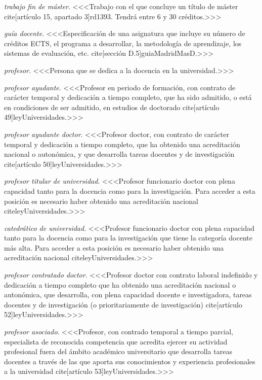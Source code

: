     \item \emph{trabajo fin de máster}. <<<Trabajo con el que concluye un título de máster cite[artículo 15, apartado 3]{rd1393}. Tendrá entre 6 y 30 créditos.>>>

    \item \emph{guía docente}. <<<Especificación de una asignatura que incluye su número de créditos ECTS, el programa a desarrollar, la metodología de aprendizaje, los sistemas de evaluación, etc. cite[sección D.5]{guiaMadridMasD}.>>>

    \item \emph{profesor}. <<<Persona que se dedica a la docencia en la universidad.>>>

    \item \emph{profesor ayudante}. <<<Profesor en periodo de formación, con contrato de carácter temporal y dedicación a tiempo completo, que ha sido admitido, o está en condiciones de ser admitido, en estudios de doctorado cite[artículo 49]{leyUniversidades}.>>>

    \item \emph{profesor ayudante doctor}. <<<Profesor doctor, con contrato de carácter temporal y dedicación a tiempo completo, que ha obtenido una acreditación nacional o autonómica, y que desarrolla tareas docentes y de investigación cite[artículo 50]{leyUniversidades}.>>>  

    \item \emph{profesor titular de universidad}. <<<Profesor funcionario doctor con plena capacidad tanto para la docencia como para la investigación. Para acceder a esta posición es necesario haber obtenido una acreditación nacional cite{leyUniversidades}.>>>

    \item \emph{catedrático de universidad}. <<<Profesor funcionario doctor con plena capacidad tanto para la docencia como para la investigación que tiene la categoría docente más alta. Para acceder a esta posición es necesario haber obtenido una acreditación nacional cite{leyUniversidades}.>>>

    \item \emph{profesor contratado doctor}. <<<Profesor doctor con contrato laboral indefinido y dedicación a tiempo completo que ha obtenido una acreditación nacional o autonómica, que desarrolla, con plena capacidad docente e investigadora, tareas docentes y de investigación (o prioritariamente de investigación) cite[artículo 52]{leyUniversidades}.>>>

    \item \emph{profesor asociado}. <<<Profesor, con contrado temporal a tiempo parcial, especialista de reconocida competencia que acredita ejercer su actividad profesional fuera del ámbito académico universitario que desarrolla tareas docentes a través de las que aporta sus conocimientos y experiencia profesionales a la universidad cite[artículo 53]{leyUniversidades}.>>>

